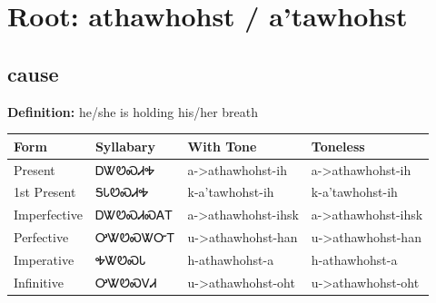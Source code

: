 \documentclass{article}%
\begin{document}
%
\normalsize%
\section*{Root: athawhohst / a'tawhohst}%
\subsection*{cause}%
\textbf{Definition: }%
he/she is holding his/her breath%
\\[0.5em]%
\begin{tabular}{|l|l|l|l|}%
\hline%
\textbf{Form}&\textbf{Syllabary}&\textbf{With Tone}&\textbf{Toneless}\\%
\hline%
Present&ᎠᏔᏬᏍᏗᎭ&a{-}>athawhohst{-}ih&a{-}>athawhohst{-}ih\\%
1st Present&ᎦᏓᏬᏍᏗᎭ&k{-}a'tawhohst{-}ih&k{-}a'tawhohst{-}ih\\%
Imperfective&ᎠᏔᏬᏍᏗᏍᎪᎢ&a{-}>athawhohst{-}ihsk&a{-}>athawhohst{-}ihsk\\%
Perfective&ᎤᏔᏬᏍᏔᏅᎢ&u{-}>athawhohst{-}han&u{-}>athawhohst{-}han\\%
Imperative&ᎭᏔᏬᏍᏓ&h{-}athawhohst{-}a&h{-}athawhohst{-}a\\%
Infinitive&ᎤᏔᏬᏍᏙᏗ&u{-}>athawhohst{-}oht&u{-}>athawhohst{-}oht\\%
\hline%
\end{tabular}%
\\[1em]%
\end{document}
